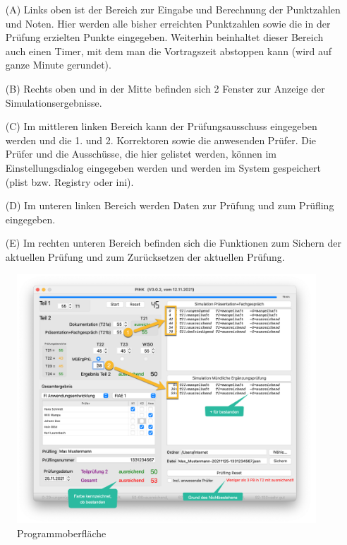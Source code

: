 \documentclass[a4paper,notitlepage,parskip=half]{scrartcl}
\begin{document}
\begin{itemize}
\item[(A)] Links oben ist der Bereich zur Eingabe und Berechnung der Punktzahlen und Noten. 
Hier werden alle bisher erreichten Punktzahlen sowie die in der Prüfung erzielten Punkte eingegeben.
Weiterhin beinhaltet dieser Bereich auch einen Timer, mit dem man die Vortragszeit abstoppen kann (wird auf ganze Minute gerundet).
\item[(B)] Rechts oben und in der Mitte befinden sich 2 Fenster zur Anzeige der Simulationsergebnisse.
\item[(C)] Im mittleren linken Bereich kann der Prüfungsausschuss eingegeben werden und die 1. und 2. Korrektoren sowie die anwesenden Prüfer. Die Prüfer und die Ausschüsse, die hier gelistet werden, können im Einstellungsdialog eingegeben werden und werden im System gespeichert (plist bzw. Registry oder ini).
\item[(D)] Im unteren linken Bereich werden Daten zur Prüfung und zum Prüfling eingegeben.
\item[(E)] Im rechten unteren Bereich befinden sich die Funktionen zum Sichern der aktuellen Prüfung und zum Zurücksetzen der aktuellen Prüfung.
\end{itemize} 

\begin{figure}[ht]
    \centering
    \includegraphics[width=\textwidth]{HauptfensterKommentiert2.png}
    \caption{Programmoberfläche}
    \label{fig:hauptfensterKommentiert2}
\end{figure}
\end{document}
